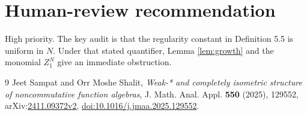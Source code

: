 \documentclass[10pt]{article}
\begin{document}
\section{Human-review recommendation}

High priority.  The key audit is that the regularity constant in Definition
5.5 is uniform in $N$.  Under that stated quantifier, Lemma
\ref{lem:growth} and the monomial $Z_1^N$ give an immediate obstruction.

\begin{thebibliography}{9}
Jeet Sampat and Orr Moshe Shalit,
\emph{Weak-* and completely isometric structure of noncommutative function
algebras},
J. Math. Anal. Appl. \textbf{550} (2025), 129552,
arXiv:\href{https://arxiv.org/abs/2411.09372}{2411.09372v2},
\href{https://doi.org/10.1016/j.jmaa.2025.129552}{doi:10.1016/j.jmaa.2025.129552}.
\end{thebibliography}
\end{document}

